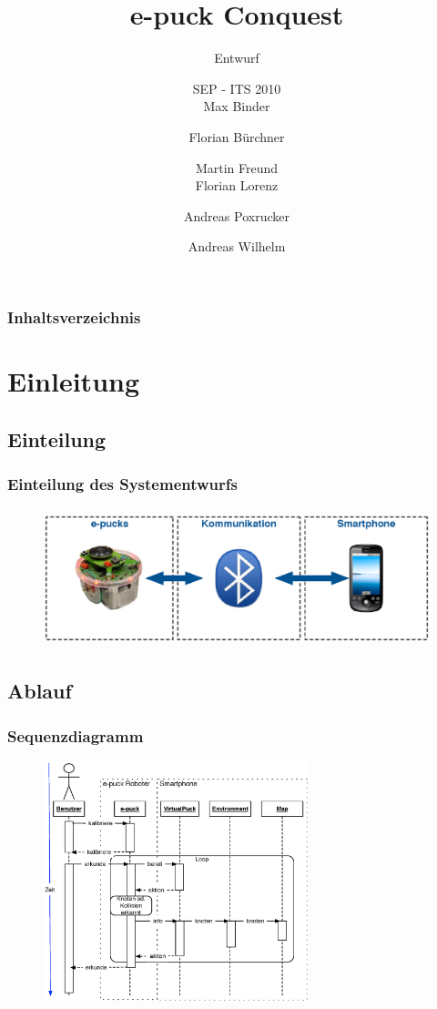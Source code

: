 \documentclass[xcolor=dvipsnames]{beamer}
\title[Entwurf] %
{e-puck Conquest}
\subtitle
{Entwurf}
\author[Binder, Bürchner, Freund, Lorenz, Poxrucker, Wilhelm] %
{SEP - ITS 2010 \\ Max Binder \and Florian Bürchner \and Martin Freund
	\\ Florian Lorenz \and Andreas Poxrucker \and Andreas Wilhelm}
\institute[Universität Passau] %
{
  Fakultät für Informatik und Mathematik\\
  Universität Passau}
\begin{document}
\lstset{language=Java, basicstyle=\footnotesize, tabsize=2}

\begin{frame}
  \titlepage
\end{frame}

\begin{frame}
  \frametitle{Inhaltsverzeichnis}
  \tableofcontents
\end{frame}	

\section{Einleitung}
	\subsection{Einteilung}
		\begin{frame}
			\frametitle{Einteilung des Systementwurfs}
			\begin{figure}[htbp]
				\centering
				\includegraphics[height=4cm]{images/einteilung.eps}
  			\end{figure}	
		\end{frame}	
	\subsection{Ablauf}
		\begin{frame}
			\frametitle{Sequenzdiagramm}
			\begin{figure}[htbp]
				\centering
				\includegraphics[height=7cm]{images/sequenzdiagramm.eps}
  			\end{figure}	
		\end{frame}	
		
\end{document}

